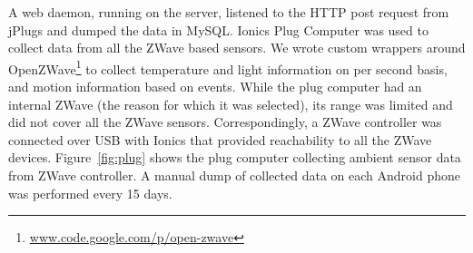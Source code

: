 \documentclass[10pt]{sensys-proc}
\newcommand{\figref}[1]{Figure~\ref{#1}}
\newcommand{\secref}[1]{Section~\ref{#1}}
\newcommand{\paradigm}{Sense-Local Store-Upload}
\begin{document}
A web daemon, running on the server, listened to the HTTP post request from jPlugs and dumped the data in MySQL. Ionics Plug Computer was used to collect data from all the ZWave based sensors. We wrote custom wrappers around OpenZWave\footnote{\url{www.code.google.com/p/open-zwave}} to collect temperature and light information on per second basis, and motion information based on events. While the plug computer had an internal ZWave (the reason for which it was selected), its range was limited and did not cover all the ZWave sensors. Correspondingly, a ZWave controller was connected over USB with Ionics that provided reachability to all the ZWave devices. %
\figref{fig:plug} shows the plug computer collecting ambient sensor data from ZWave controller. A manual dump of collected data on each Android phone was performed every 15 days.




\end{document}
